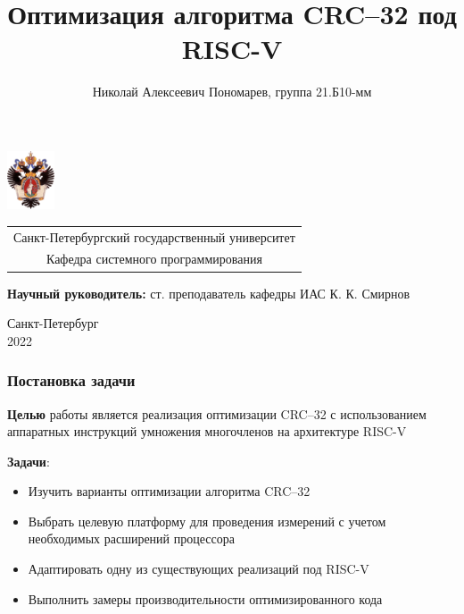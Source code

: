 \documentclass[aspectratio=169]{beamer}
\title[Оптимизация CRC--32]{Оптимизация алгоритма CRC--32 под RISC-V}
\institute[СПбГУ]{}
\author[Николай Пономарев]{Николай Алексеевич Пономарев, группа 21.Б10-мм}
\begin{document}
{
\begin{frame}
  \includegraphics[width=1.4cm]{pictures/SPbGU_Logo.png}
  \vspace{-35pt}
  \hspace{-10pt}
  \begin{center}
    \begin{tabular}{c}
      \scriptsize{Санкт-Петербургский государственный университет} \\
      \scriptsize{Кафедра системного программирования}
    \end{tabular}
    \titlepage
  \end{center}

  \btVFill

  {\scriptsize
    {\bfseries Научный руководитель:} ст. преподаватель кафедры ИАС К. К. Смирнов \\
  }
  \begin{center}
    \vspace{5pt}
    \scriptsize{Санкт-Петербург\\
      2022}
  \end{center}

\end{frame}
}

\begin{frame}
  \frametitle{Постановка задачи}
  \textbf{Целью} работы является реализация оптимизации CRC--32 с использованием аппаратных инструкций умножения многочленов на архитектуре RISC-V

  \textbf{Задачи}:
  \begin{itemize}
    \item Изучить варианты оптимизации алгоритма CRC--32
    \item Выбрать целевую платформу для проведения измерений с учетом необходимых расширений процессора
    \item Адаптировать одну из существующих реализаций под RISC-V
    \item Выполнить замеры производительности оптимизированного кода
  \end{itemize}
\end{frame}
\end{document}
